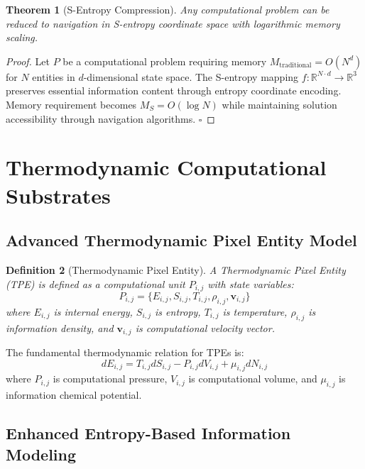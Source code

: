 \documentclass[12pt,a4paper]{article}
\newtheorem{theorem}{Theorem}[section]
\newtheorem{definition}[theorem]{Definition}
\begin{document}
\begin{theorem}[S-Entropy Compression]
Any computational problem can be reduced to navigation in S-entropy coordinate space with logarithmic memory scaling.
\end{theorem}

\begin{proof}
Let $P$ be a computational problem requiring memory $M_{\text{traditional}} = O(N^d)$ for $N$ entities in $d$-dimensional state space. The S-entropy mapping $f: \mathbb{R}^{N \cdot d} \to \mathbb{R}^3$ preserves essential information content through entropy coordinate encoding. Memory requirement becomes $M_{S} = O(\log N)$ while maintaining solution accessibility through navigation algorithms. $\square$
\end{proof}

\section{Thermodynamic Computational Substrates}

\subsection{Advanced Thermodynamic Pixel Entity Model}

\begin{definition}[Thermodynamic Pixel Entity]
A Thermodynamic Pixel Entity (TPE) is defined as a computational unit $P_{i,j}$ with state variables:
\begin{equation}
P_{i,j} = \{E_{i,j}, S_{i,j}, T_{i,j}, \rho_{i,j}, \mathbf{v}_{i,j}\}
\end{equation}
where $E_{i,j}$ is internal energy, $S_{i,j}$ is entropy, $T_{i,j}$ is temperature, $\rho_{i,j}$ is information density, and $\mathbf{v}_{i,j}$ is computational velocity vector.
\end{definition}

The fundamental thermodynamic relation for TPEs is:
\begin{equation}
dE_{i,j} = T_{i,j}dS_{i,j} - P_{i,j}dV_{i,j} + \mu_{i,j}dN_{i,j}
\end{equation}
where $P_{i,j}$ is computational pressure, $V_{i,j}$ is computational volume, and $\mu_{i,j}$ is information chemical potential.

\subsection{Enhanced Entropy-Based Information Modeling}
\end{document}

